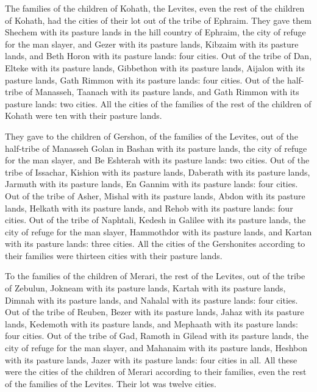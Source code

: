  The families of the children of Kohath, the Levites, even
the rest of the children of Kohath, had the cities of their lot out of
the tribe of Ephraim.  They gave them Shechem with its
pasture lands in the hill country of Ephraim, the city of refuge for the
man slayer, and Gezer with its pasture lands,  Kibzaim with
its pasture lands, and Beth Horon with its pasture lands: four cities.
 Out of the tribe of Dan, Elteke with its pasture lands,
Gibbethon with its pasture lands,  Aijalon with its pasture
lands, Gath Rimmon with its pasture lands: four cities. 
Out of the half-tribe of Manasseh, Taanach with its pasture lands, and
Gath Rimmon with its pasture lands: two cities.  All the
cities of the families of the rest of the children of Kohath were ten
with their pasture lands.

 They gave to the children of Gershon, of the families of
the Levites, out of the half-tribe of Manasseh Golan in Bashan with its
pasture lands, the city of refuge for the man slayer, and Be Eshterah
with its pasture lands: two cities.  Out of the tribe of
Issachar, Kishion with its pasture lands, Daberath with its pasture
lands,  Jarmuth with its pasture lands, En Gannim with its
pasture lands: four cities.  Out of the tribe of Asher,
Mishal with its pasture lands, Abdon with its pasture lands,
 Helkath with its pasture lands, and Rehob with its pasture
lands: four cities.  Out of the tribe of Naphtali, Kedesh
in Galilee with its pasture lands, the city of refuge for the man
slayer, Hammothdor with its pasture lands, and Kartan with its pasture
lands: three cities.  All the cities of the Gershonites
according to their families were thirteen cities with their pasture
lands.

 To the families of the children of Merari, the rest of the
Levites, out of the tribe of Zebulun, Jokneam with its pasture lands,
Kartah with its pasture lands,  Dimnah with its pasture
lands, and Nahalal with its pasture lands: four cities. 
Out of the tribe of Reuben, Bezer with its pasture lands, Jahaz with its
pasture lands,  Kedemoth with its pasture lands, and
Mephaath with its pasture lands: four cities.  Out of the
tribe of Gad, Ramoth in Gilead with its pasture lands, the city of
refuge for the man slayer, and Mahanaim with its pasture lands,
 Heshbon with its pasture lands, Jazer with its pasture
lands: four cities in all.  All these were the cities of
the children of Merari according to their families, even the rest of the
families of the Levites. Their lot was twelve cities.

